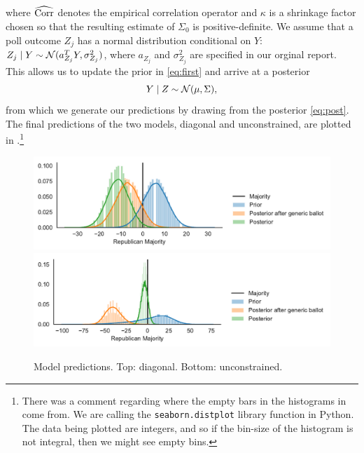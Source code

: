 \documentclass[12pt, letterpaper]{article}
\newcommand{\cm}{{\color{Red}{\textsf{[C]}}}}
\begin{document}
where $\widehat{\operatorname{Corr}}$ denotes the empirical correlation operator and $\kappa$ is a shrinkage factor chosen so that the resulting estimate of $\Sigma_0$ is positive-definite. We assume that a poll outcome $Z_j$ has a normal distribution conditional on $Y$: $Z_j \mid Y \sim \mathcal{N}(a_{Z_j}^T Y, \sigma_{Z_j}^2)$, where $a_{Z_j}$ and $\sigma_{Z_j}^2$ are specified in our orginal report. This allows us to update the prior in \eqref{eq:first} and arrive at a posterior \begin{equation}
  Y \mid Z \sim \mathcal{N}(\mu, \Sigma),
  \label{eq:post}
\end{equation}
from which we generate our predictions by drawing from the posterior \eqref{eq:post}. The final predictions of the two models, diagonal and unconstrained, are plotted in .\footnote{\cm{} There was a comment regarding where the empty bars in the histograms in  come from. We are calling the \texttt{seaborn.distplot} library function in Python. The data being plotted are integers, and so if the bin-size of the histogram is not integral, then we might see empty bins. }
\begin{figure}[tbh]
  \centering
  \includegraphics[width=\textwidth]{rep_seats_with_diagonal_prior.pdf}
  \includegraphics[width=\textwidth]{rep_seats.pdf}
  \caption{Model predictions. Top: diagonal. Bottom: unconstrained. }
  \label{fig:model}
\end{figure}
\end{document}
